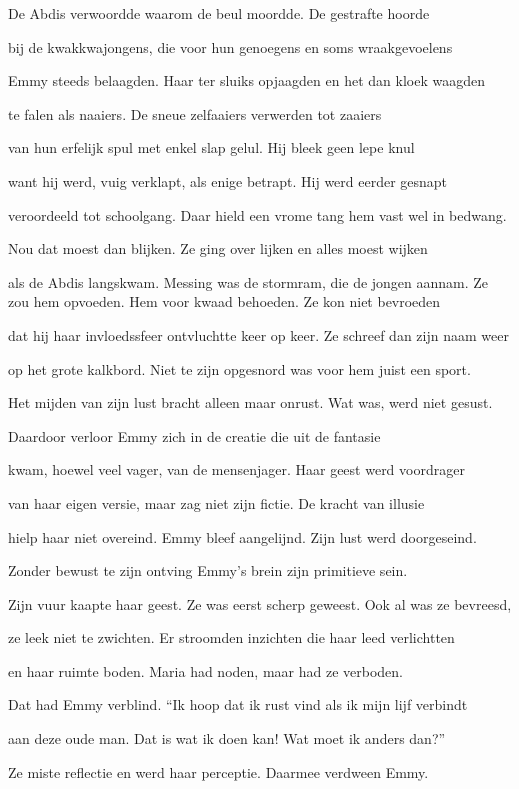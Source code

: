 De Abdis verwoordde
waarom de beul moordde.
De gestrafte hoorde

bij de kwakkwajongens,
die voor hun genoegens
en soms wraakgevoelens

Emmy steeds belaagden.
Haar ter sluiks opjaagden
en het dan kloek waagden

te falen als naaiers.
De sneue zelfaaiers
verwerden tot zaaiers

van hun erfelijk spul
met enkel slap gelul.
Hij bleek geen lepe knul

want hij werd, vuig verklapt,
als enige betrapt.
Hij werd eerder gesnapt

veroordeeld tot schoolgang.
Daar hield een vrome tang
hem vast wel in bedwang.

Nou dat moest dan blijken.
Ze ging over lijken
en alles moest wijken

als de Abdis langskwam.
Messing was de stormram,
die de jongen aannam.
Ze zou hem opvoeden.
Hem voor kwaad behoeden.
Ze kon niet bevroeden

dat hij haar invloedssfeer
ontvluchtte keer op keer.
Ze schreef dan zijn naam weer

op het grote kalkbord.
Niet te zijn opgesnord
was voor hem juist een sport.

Het mijden van zijn lust
bracht alleen maar onrust.
Wat was, werd niet gesust.

Daardoor verloor Emmy
zich in de creatie
die uit de fantasie

kwam, hoewel veel vager,
van de mensenjager.
Haar geest werd voordrager

van haar eigen versie,
maar zag niet zijn fictie.
De kracht van illusie

hielp haar niet overeind.
Emmy bleef aangelijnd.
Zijn lust werd doorgeseind.

Zonder bewust te zijn
ontving Emmy’s brein
zijn primitieve sein.

Zijn vuur kaapte haar geest.
Ze was eerst scherp geweest.
Ook al was ze bevreesd,

ze leek niet te zwichten.
Er stroomden inzichten
die haar leed verlichtten

en haar ruimte boden.
Maria had noden,
maar had ze verboden.

Dat had Emmy verblind.
“Ik hoop dat ik rust vind
als ik mijn lijf verbindt

aan deze oude man.
Dat is wat ik doen kan!
Wat moet ik anders dan?”

Ze miste reflectie
en werd haar perceptie.
Daarmee verdween Emmy.

